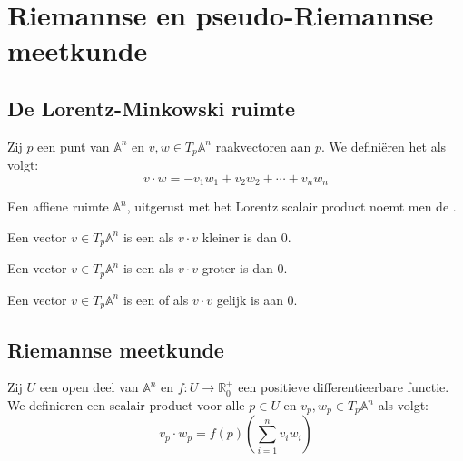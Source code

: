 \documentclass[main.tex]{subfiles}
\begin{document}
\chapter{Riemannse en pseudo-Riemannse meetkunde}
\label{cha:rieman}

\section{De Lorentz-Minkowski ruimte}
\label{sec:de-lorentz-minkowski}

\begin{de}
  Zij $p$ een punt van $\mathbb{A}^{n}$ en $v,w\in T_{p}\mathbb{A}^{n}$ raakvectoren aan $p$.
  We defini\"eren het  als volgt:
  \[ v \cdot w = -v_{1}w_{1} + v_{2}w_{2} + \dotsb + v_{n}w_{n} \]
\end{de}

\begin{de}
  Een affiene ruimte $\mathbb{A}^{n}$, uitgerust met het Lorentz scalair product noemt men de .
\end{de}

\begin{de}
  Een vector $v\in T_{p}\mathbb{A}^{n}$ is een  als $v\cdot v$ kleiner is dan $0$.
\end{de}

\begin{de}
  Een vector $v\in T_{p}\mathbb{A}^{n}$ is een  als $v\cdot v$ groter is dan $0$.
\end{de}

\begin{de}
  Een vector $v\in T_{p}\mathbb{A}^{n}$ is een  of  als $v\cdot v$ gelijk is aan $0$.
\end{de}

\section{Riemannse meetkunde}
\label{sec:riemannse-meetkunde}

\begin{de}
  Zij $U$ een open deel van $\mathbb{A}^{n}$ en $f: U \rightarrow \mathbb{R}^{+}_{0}$ een positieve differentieerbare functie.
  We definieren een scalair product voor alle $p\in U$ en $v_{p},w_{p} \in T_{p}\mathbb{A}^{n}$ als volgt:
  \[ v_{p}\cdot w_{p} = f(p)\left( \sum_{i=1}^{n}v_{i}w_{i} \right) \]
\end{de}
\end{document}
